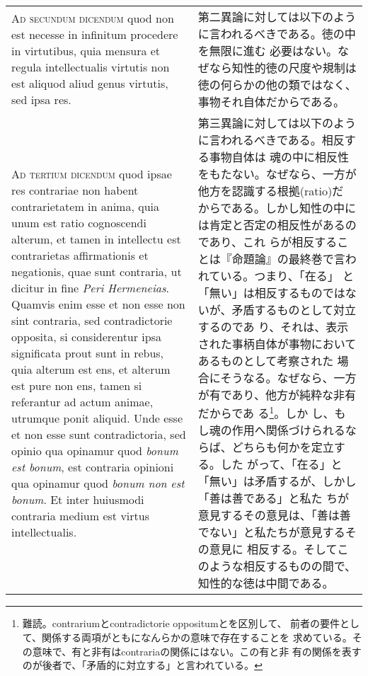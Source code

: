 \documentclass[10pt]{jsarticle}
\begin{document}
\begin{longtable}{p{21em}p{21em}}
{\scshape Ad secundum dicendum} quod non est necesse in infinitum
procedere in virtutibus, quia mensura et regula intellectualis
virtutis non est aliquod aliud genus virtutis, sed ipsa res.

&

 第二異論に対しては以下のように言われるべきである。徳の中を無限に進む
 必要はない。なぜなら知性的徳の尺度や規制は徳の何らかの他の類ではなく、
 事物それ自体だからである。

\\


{\scshape Ad tertium dicendum} quod ipsae res contrariae non habent
contrarietatem in anima, quia unum est ratio cognoscendi alterum, et
tamen in intellectu est contrarietas affirmationis et negationis, quae
sunt contraria, ut dicitur in fine {\itshape Peri Hermeneias}. Quamvis
enim esse et non esse non sint contraria, sed contradictorie opposita,
si considerentur ipsa significata prout sunt in rebus, quia alterum
est ens, et alterum est pure non ens, tamen si referantur ad actum
animae, utrumque ponit aliquid. Unde esse et non esse sunt
contradictoria, sed opinio qua opinamur quod {\itshape bonum est
bonum}, est contraria opinioni qua opinamur quod {\itshape bonum non
est bonum}. Et inter huiusmodi contraria medium est virtus
intellectualis.


&

 第三異論に対しては以下のように言われるべきである。相反する事物自体は
 魂の中に相反性をもたない。なぜなら、一方が他方を認識する根拠(ratio)だ
 からである。しかし知性の中には肯定と否定の相反性があるのであり、これ
 らが相反することは『命題論』の最終巻で言われている。つまり、「在る」
 と「無い」は相反するものではないが、矛盾するものとして対立するのであ
 り、それは、表示された事柄自体が事物においてあるものとして考察された
 場合にそうなる。なぜなら、一方が有であり、他方が純粋な非有だからであ
 る\footnote{難読。contrariumとcontradictorie oppositumとを区別して、
 前者の要件として、関係する両項がともになんらかの意味で存在することを
 求めている。その意味で、有と非有はcontrariaの関係にはない。この有と非
 有の関係を表すのが後者で、「矛盾的に対立する」と言われている。}。しか
 し、もし魂の作用へ関係づけられるならば、どちらも何かを定立する。した
 がって、「在る」と「無い」は矛盾するが、しかし「善は善である」と私た
 ちが意見するその意見は、「善は善でない」と私たちが意見するその意見に
 相反する。そしてこのような相反するものの間で、知性的な徳は中間である。

\end{longtable}
\newpage
\end{document}
